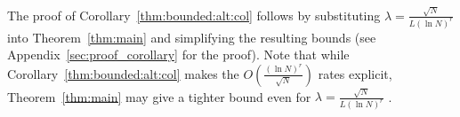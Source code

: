 \documentclass{article}
\DeclareMathOperator*{\argmin}{arg\,min}
\newtheorem{lemma}[theorem]{Lemma}
\begin{document}
The proof of Corollary~\ref{thm:bounded:alt:col} follows by substituting $\lambda=\frac{\sqrt{N}}{L(\ln N)^r}$ into Theorem~\ref{thm:main} and simplifying the resulting bounds (see Appendix~\ref{sec:proof_corollary} for the proof).
Note that while Corollary~\ref{thm:bounded:alt:col} makes the $O\left(\frac{(\ln N)^r}{\sqrt{N}}\right)$ rates explicit, Theorem~\ref{thm:main} may give a  tighter bound even for $\lambda=\frac{\sqrt{N}}{L(\ln N)^r}$ \cite{alquier2021userfriendly}.


\end{document}
